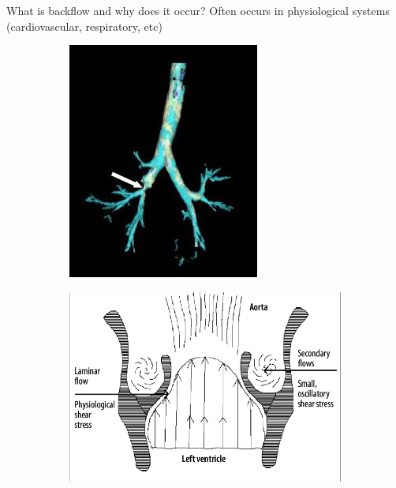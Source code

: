 \begin{frame}{What is backflow and why does it occur?}
    Often occurs in physiological systems (cardiovascular, respiratory, etc)
    \begin{figure}[h]
     \centering
     \begin{subfigure}[b]{0.3\textwidth}
         \centering
         \includegraphics[width=\textwidth]{Media/Stenosis1.png}
     \end{subfigure}
     \hfill
     \begin{subfigure}[b]{0.3\textwidth}
         \centering
         \includegraphics[width=\textwidth]{Media/Stenosis2.png}

\end{subfigure}
\end{figure}
\end{frame}
